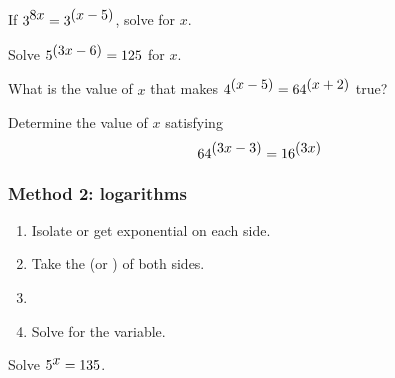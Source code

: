 \begin{exercise}
If $\displaystyle 3^{\displaystyle 8x}=3^{\displaystyle (x-5)}$, solve for $x$.
\end{exercise}
\begin{solution}[3.25in]

\end{solution}

\begin{exercise}
Solve $5^{\displaystyle(3x-6)}=125$ for $x$.
\end{exercise}
\begin{solution}[4in]

\end{solution}

\begin{exercise}
What is the value of $x$ that makes $4^{\displaystyle(x-5)}=64^{\displaystyle(x+2)}$ true?
\end{exercise}
\begin{solution}[4in]

\end{solution}

\begin{exercise}
Determine the value of $x$ satisfying
\[
64^{\displaystyle(3x-3)}=16^{\displaystyle(3x)}
\]
\end{exercise}
\begin{solution}[4in]

\end{solution}

\subsubsection*{Method 2: logarithms}
\begin{enumerate}[1)]
    \item Isolate  or get  exponential on each side.
    \item Take the  (or )
    of both sides.
    \item {}
    \item Solve for the variable.
\end{enumerate}

\begin{exercise}
Solve $5^{\displaystyle x}=135$.
\end{exercise}
\begin{solution}[2in]

\end{solution}

